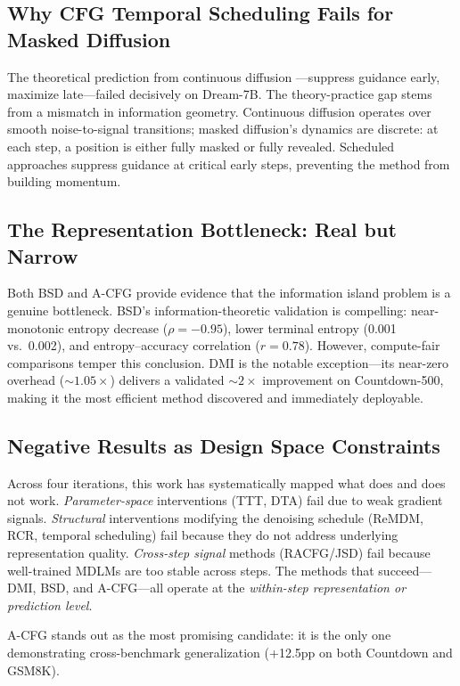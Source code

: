 \documentclass{article}
\begin{document}
\subsection{Why CFG Temporal Scheduling Fails for Masked Diffusion}

The theoretical prediction from continuous diffusion \citep{rojas2025cfgschedule}---suppress guidance early, maximize late---failed decisively on Dream-7B. The theory-practice gap stems from a mismatch in information geometry. Continuous diffusion operates over smooth noise-to-signal transitions; masked diffusion's dynamics are discrete: at each step, a position is either fully masked or fully revealed. Scheduled approaches suppress guidance at critical early steps, preventing the method from building momentum.

\subsection{The Representation Bottleneck: Real but Narrow}

Both BSD and A-CFG provide evidence that the information island problem is a genuine bottleneck. BSD's information-theoretic validation is compelling: near-monotonic entropy decrease ($\rho = -0.95$), lower terminal entropy (0.001 vs.\ 0.002), and entropy--accuracy correlation ($r = 0.78$). However, compute-fair comparisons temper this conclusion. DMI is the notable exception---its near-zero overhead (${\sim}1.05{\times}$) delivers a validated ${\sim}2{\times}$ improvement on Countdown-500, making it the most efficient method discovered and immediately deployable.

\subsection{Negative Results as Design Space Constraints}

Across four iterations, this work has systematically mapped what does and does not work. \emph{Parameter-space} interventions (TTT, DTA) fail due to weak gradient signals. \emph{Structural} interventions modifying the denoising schedule (ReMDM, RCR, temporal scheduling) fail because they do not address underlying representation quality. \emph{Cross-step signal} methods (RACFG/JSD) fail because well-trained MDLMs are too stable across steps. The methods that succeed---DMI, BSD, and A-CFG---all operate at the \emph{within-step representation or prediction level}.

A-CFG stands out as the most promising candidate: it is the only one demonstrating cross-benchmark generalization (+12.5pp on both Countdown and GSM8K).
\end{document}
